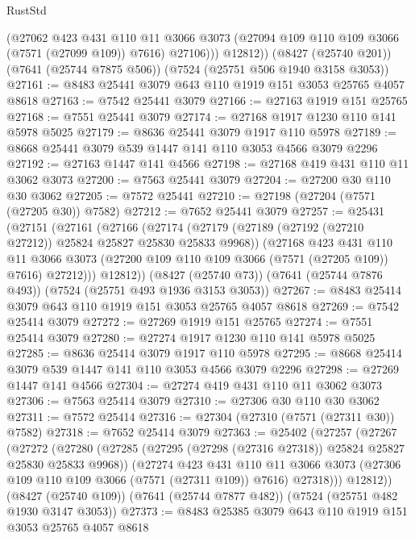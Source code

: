 \begin{lexlean}{RustStd}
\begin{coremodule}
            (@27062
              @423
              @431
              @110
              @11
              @3066
              @3073
              (@27094 @109 @110 @109 @3066 (@7571 (@27099 @109)) @7616)
              @27106)))
        @12812))
    (@8427 (@25740 @201))
    (@7641 (@25744 @7875 @506))
    (@7524 (@25751 @506 @1940 @3158 @3053))
@27161 := @8483 @25441 @3079 @643 @110 @1919 @151 @3053 @25765 @4057 @8618
@27163 := @7542 @25441 @3079
@27166 := @27163 @1919 @151 @25765
@27168 := @7551 @25441 @3079
@27174 := @27168 @1917 @1230 @110 @141 @5978 @5025
@27179 := @8636 @25441 @3079 @1917 @110 @5978
@27189 := @8668 @25441 @3079 @539 @1447 @141 @110 @3053 @4566 @3079 @2296
@27192 := @27163 @1447 @141 @4566
@27198 := @27168 @419 @431 @110 @11 @3062 @3073
@27200 := @7563 @25441 @3079
@27204 := @27200 @30 @110 @30 @3062
@27205 := @7572 @25441
@27210 := @27198 (@27204 (@7571 (@27205 @30)) @7582)
@27212 := @7652 @25441 @3079
@27257 := @25431
    (@27151
      (@27161
        (@27166
          (@27174
            (@27179 (@27189 (@27192 (@27210 @27212)) @25824 @25827 @25830 @25833 @9968))
            (@27168
              @423
              @431
              @110
              @11
              @3066
              @3073
              (@27200 @109 @110 @109 @3066 (@7571 (@27205 @109)) @7616)
              @27212)))
        @12812))
    (@8427 (@25740 @73))
    (@7641 (@25744 @7876 @493))
    (@7524 (@25751 @493 @1936 @3153 @3053))
@27267 := @8483 @25414 @3079 @643 @110 @1919 @151 @3053 @25765 @4057 @8618
@27269 := @7542 @25414 @3079
@27272 := @27269 @1919 @151 @25765
@27274 := @7551 @25414 @3079
@27280 := @27274 @1917 @1230 @110 @141 @5978 @5025
@27285 := @8636 @25414 @3079 @1917 @110 @5978
@27295 := @8668 @25414 @3079 @539 @1447 @141 @110 @3053 @4566 @3079 @2296
@27298 := @27269 @1447 @141 @4566
@27304 := @27274 @419 @431 @110 @11 @3062 @3073
@27306 := @7563 @25414 @3079
@27310 := @27306 @30 @110 @30 @3062
@27311 := @7572 @25414
@27316 := @27304 (@27310 (@7571 (@27311 @30)) @7582)
@27318 := @7652 @25414 @3079
@27363 := @25402
    (@27257
      (@27267
        (@27272
          (@27280
            (@27285 (@27295 (@27298 (@27316 @27318)) @25824 @25827 @25830 @25833 @9968))
            (@27274
              @423
              @431
              @110
              @11
              @3066
              @3073
              (@27306 @109 @110 @109 @3066 (@7571 (@27311 @109)) @7616)
              @27318)))
        @12812))
    (@8427 (@25740 @109))
    (@7641 (@25744 @7877 @482))
    (@7524 (@25751 @482 @1930 @3147 @3053))
@27373 := @8483 @25385 @3079 @643 @110 @1919 @151 @3053 @25765 @4057 @8618

\end{coremodule}
\end{lexlean}
